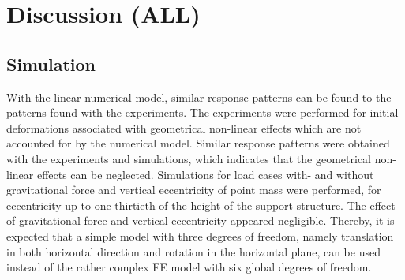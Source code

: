 \documentclass{article}
\begin{document}
\clearpage

\section{Discussion (ALL)}
\label{sec:discussion}

\subsection{Simulation}
With the linear numerical model, similar response patterns can be found to the patterns found with the experiments. The experiments were performed for initial deformations associated with geometrical non-linear effects which are not accounted for by the numerical model. Similar response patterns were obtained with the experiments and simulations, which indicates that the geometrical non-linear effects can be neglected. Simulations for load cases with- and without gravitational force and vertical eccentricity of point mass were performed, for eccentricity up to one thirtieth of the height of the support structure. The effect of  gravitational force and vertical eccentricity appeared negligible. Thereby, it is expected that a simple model with three degrees of freedom, namely translation in both horizontal direction and rotation in the horizontal plane, can be used instead of the rather complex FE model with six global degrees of freedom.
\end{document}
